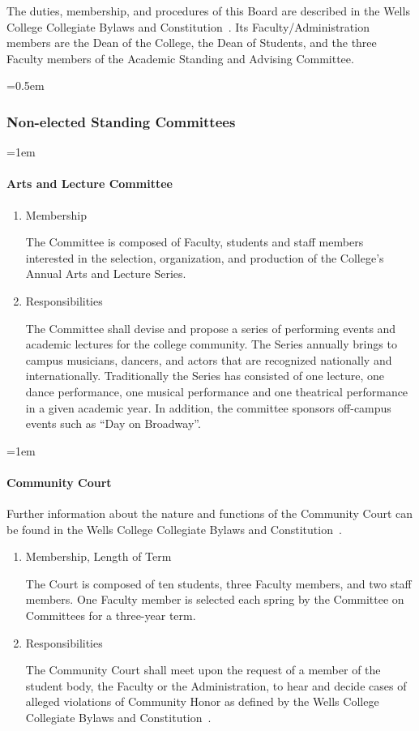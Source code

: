 \documentclass{manual}
\newcommand{\constitution}{Wells College Collegiate Bylaws and Constitution~}
\let\oldsubsubsection\subsubsection
\renewcommand\subsubsection{\leftskip=0.5em\oldsubsubsection}
\let\oldparagraph\paragraph
\renewcommand\paragraph{\leftskip=1em\oldparagraph}
\newcommand{\itemLevelA}{\alph*.}
\newcommand{\itemRefA}{\alph*}
\begin{document}
The duties, membership, and procedures of this Board are described in the \constitution. Its Faculty/Administration members are the Dean of the College, the Dean of Students, and the three Faculty members of the Academic Standing and Advising Committee.


\subsubsection{Non-elected Standing Committees}


\paragraph{Arts and Lecture Committee}

\begin{enumerate}[label=\itemLevelA,ref=\itemRefA]

\item Membership

The Committee is composed of Faculty, students and staff members interested in the selection, organization, and production of the College's Annual Arts and Lecture Series.

\item Responsibilities

The Committee shall devise and propose a series of performing events and academic lectures for the college community. The Series annually brings to campus musicians, dancers, and actors that are recognized nationally and internationally. Traditionally the Series has consisted of one lecture, one dance performance, one musical performance and one theatrical performance in a given academic year. In addition, the committee sponsors off-campus events such as ``Day on Broadway''.

\end{enumerate}


\paragraph{Community Court}

Further information about the nature and functions of the Community Court can be found in the \constitution.
\begin{enumerate}[label=\itemLevelA,ref=\itemRefA]

\item Membership, Length of Term

The Court is composed of ten students, three Faculty members, and two staff members. One Faculty member is selected each spring by the Committee on Committees for a three-year term.

\item Responsibilities

The Community Court shall meet upon the request of a member of the student body, the Faculty or the Administration, to hear and decide cases of alleged violations of Community Honor as defined by the \constitution.
\end{enumerate}
\end{document}
